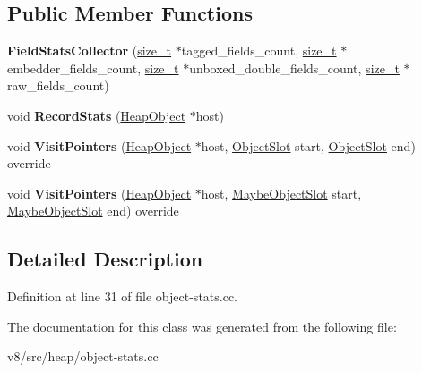 \subsection*{Public Member Functions}
\begin{DoxyCompactItemize}
\item 
\mbox{\label{classv8_1_1internal_1_1FieldStatsCollector_a271c3a090be6135df5ee879864b2c6a9}} 
{\bfseries Field\+Stats\+Collector} (\mbox{\hyperlink{classsize__t}{size\+\_\+t}} $\ast$tagged\+\_\+fields\+\_\+count, \mbox{\hyperlink{classsize__t}{size\+\_\+t}} $\ast$embedder\+\_\+fields\+\_\+count, \mbox{\hyperlink{classsize__t}{size\+\_\+t}} $\ast$unboxed\+\_\+double\+\_\+fields\+\_\+count, \mbox{\hyperlink{classsize__t}{size\+\_\+t}} $\ast$raw\+\_\+fields\+\_\+count)
\item 
\mbox{\label{classv8_1_1internal_1_1FieldStatsCollector_a96c4f9bd4271a83af938ac0e6f3e649f}} 
void {\bfseries Record\+Stats} (\mbox{\hyperlink{classv8_1_1internal_1_1HeapObject}{Heap\+Object}} $\ast$host)
\item 
\mbox{\label{classv8_1_1internal_1_1FieldStatsCollector_a293f3febb3bca7ed420ac8d91da00807}} 
void {\bfseries Visit\+Pointers} (\mbox{\hyperlink{classv8_1_1internal_1_1HeapObject}{Heap\+Object}} $\ast$host, \mbox{\hyperlink{classv8_1_1internal_1_1ObjectSlot}{Object\+Slot}} start, \mbox{\hyperlink{classv8_1_1internal_1_1ObjectSlot}{Object\+Slot}} end) override
\item 
\mbox{\label{classv8_1_1internal_1_1FieldStatsCollector_aea80a0e8d645bc85cb8927643d36bfa5}} 
void {\bfseries Visit\+Pointers} (\mbox{\hyperlink{classv8_1_1internal_1_1HeapObject}{Heap\+Object}} $\ast$host, \mbox{\hyperlink{classv8_1_1internal_1_1MaybeObjectSlot}{Maybe\+Object\+Slot}} start, \mbox{\hyperlink{classv8_1_1internal_1_1MaybeObjectSlot}{Maybe\+Object\+Slot}} end) override
\end{DoxyCompactItemize}


\subsection{Detailed Description}


Definition at line 31 of file object-\/stats.\+cc.



The documentation for this class was generated from the following file\+:\begin{DoxyCompactItemize}
\item 
v8/src/heap/object-\/stats.\+cc\end{DoxyCompactItemize}
